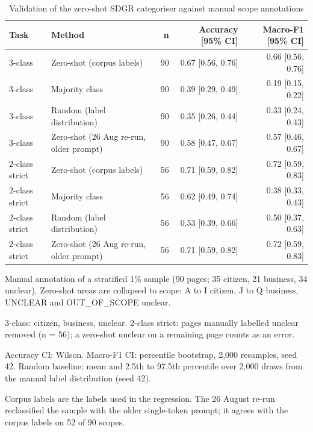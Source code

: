 \begin{table}[htbp]
\centering
\small
\begin{threeparttable}
\caption{Validation of the zero-shot SDGR categoriser against manual scope annotations}
\label{tab:zeroshot-validation}
\begin{tabular}{llrrr}
\hline
Task & Method & n & Accuracy [95\% CI] & Macro-F1 [95\% CI] \\
\hline
3-class & Zero-shot (corpus labels) & 90 & 0.67 [0.56, 0.76] & 0.66 [0.56, 0.76] \\
3-class & Majority class & 90 & 0.39 [0.29, 0.49] & 0.19 [0.15, 0.22] \\
3-class & Random (label distribution) & 90 & 0.35 [0.26, 0.44] & 0.33 [0.24, 0.43] \\
3-class & Zero-shot (26 Aug re-run, older prompt) & 90 & 0.58 [0.47, 0.67] & 0.57 [0.46, 0.67] \\
\hline
2-class strict & Zero-shot (corpus labels) & 56 & 0.71 [0.59, 0.82] & 0.72 [0.59, 0.83] \\
2-class strict & Majority class & 56 & 0.62 [0.49, 0.74] & 0.38 [0.33, 0.43] \\
2-class strict & Random (label distribution) & 56 & 0.53 [0.39, 0.66] & 0.50 [0.37, 0.63] \\
2-class strict & Zero-shot (26 Aug re-run, older prompt) & 56 & 0.71 [0.59, 0.82] & 0.72 [0.59, 0.83] \\
\hline
\end{tabular}
\begin{tablenotes}
\footnotesize
\item Manual annotation of a stratified 1\% sample (90 pages; 35 citizen, 21 business, 34 unclear). Zero-shot areas are collapsed to scope: A to I citizen, J to Q business, UNCLEAR and OUT\_OF\_SCOPE unclear.
\item 3-class: citizen, business, unclear. 2-class strict: pages manually labelled unclear removed (n = 56); a zero-shot unclear on a remaining page counts as an error.
\item Accuracy CI: Wilson. Macro-F1 CI: percentile bootstrap, 2,000 resamples, seed 42. Random baseline: mean and 2.5th to 97.5th percentile over 2,000 draws from the manual label distribution (seed 42).
\item Corpus labels are the labels used in the regression. The 26 August re-run reclassified the sample with the older single-token prompt; it agrees with the corpus labels on 52 of 90 scopes.
\end{tablenotes}
\end{threeparttable}
\end{table}
